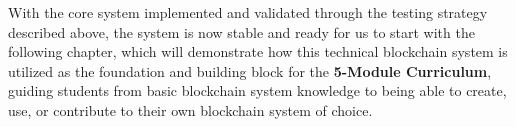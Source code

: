 With the core system implemented and validated through the testing strategy described above, the system is now stable and ready for us to start with the following chapter, which will demonstrate how this technical blockchain system is utilized as the foundation and building block for the \textbf{5-Module Curriculum}, guiding students from basic blockchain system knowledge to being able to create, use, or contribute to their own blockchain system of choice.
